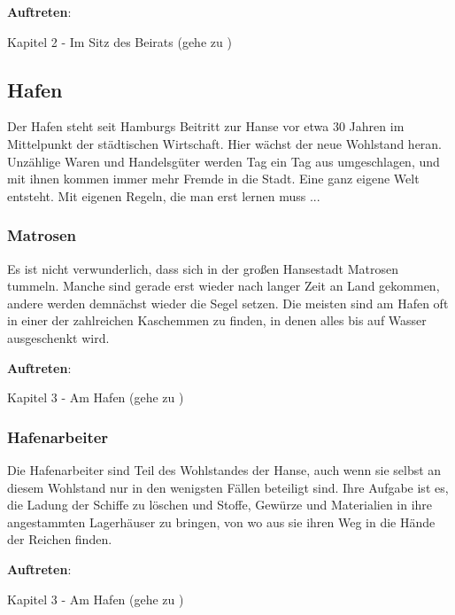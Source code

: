 
\textbf{Auftreten}:

Kapitel 2 - Im Sitz des Beirats (gehe zu \blue{\ref{kind}})


\subsection{Hafen}

Der Hafen steht seit Hamburgs Beitritt zur Hanse vor etwa 30 Jahren im Mittelpunkt der städtischen Wirtschaft. Hier wächst der neue Wohlstand heran. Unzählige Waren und Handelsgüter werden Tag ein Tag aus umgeschlagen, und mit ihnen kommen immer mehr Fremde in die Stadt. Eine ganz eigene Welt entsteht. Mit eigenen Regeln, die man erst lernen muss ...

\subsubsection*{Matrosen}
\label{Matrosen}

Es ist nicht verwunderlich, dass sich in der großen Hansestadt Matrosen tummeln. Manche sind gerade erst wieder nach langer Zeit an Land gekommen, andere werden demnächst wieder die Segel setzen. Die meisten sind am Hafen oft in einer der zahlreichen Kaschemmen zu finden, in denen alles bis auf Wasser ausgeschenkt wird.

\textbf{Auftreten}:

Kapitel 3 - Am Hafen (gehe zu \blue{\ref{Hafen}})

\subsubsection*{Hafenarbeiter}
\label{Hafenarbeiter}

Die Hafenarbeiter sind Teil des Wohlstandes der Hanse, auch wenn sie selbst an diesem Wohlstand nur in den wenigsten Fällen beteiligt sind. Ihre Aufgabe ist es, die Ladung der Schiffe zu löschen und Stoffe, Gewürze und Materialien in ihre angestammten Lagerhäuser zu bringen, von wo aus sie ihren Weg in die Hände der Reichen finden.


\textbf{Auftreten}:

Kapitel 3 - Am Hafen (gehe zu \blue{\ref{Hafen}})

